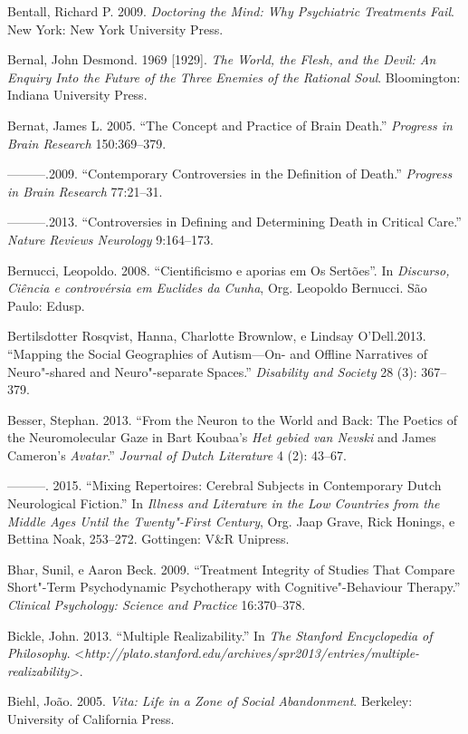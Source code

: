 Bentall, Richard P. 2009. \emph{Doctoring the Mind: Why Psychiatric
Treatments Fail}. New York: New York University Press.

Bernal, John Desmond. 1969 {[}1929{]}. \emph{The World, the Flesh, and
the Devil: An Enquiry Into the Future of the Three Enemies of the
Rational Soul}. Bloomington: Indiana University Press.

Bernat, James L. 2005. ``The Concept and Practice of Brain Death.''
\emph{Progress in Brain Research} 150:369--379.

---------.2009. ``Contemporary Controversies in the Definition of
Death.'' \emph{Progress in Brain Research} 77:21--31.

---------.2013. ``Controversies in Defining and Determining Death in
Critical Care.'' \emph{Nature Reviews Neurology} 9:164--173.

Bernucci, Leopoldo. 2008. ``Cientificismo e aporias em Os Sertões''. In
\emph{Discurso, Ciência e controvérsia em Euclides da Cunha}, Org.
Leopoldo Bernucci. São Paulo: Edusp.

Bertilsdotter Rosqvist, Hanna, Charlotte Brownlow, e Lindsay
O'Dell.2013. ``Mapping the Social Geographies of Autism---On- and
Offline Narratives of Neuro"-shared and Neuro"-separate Spaces.''
\emph{Disability and Society} 28 (3): 367--379.

Besser, Stephan. 2013. ``From the Neuron to the World and Back: The
Poetics of the Neuromolecular Gaze in Bart Koubaa's \emph{Het gebied van
Nevski} and James Cameron's \emph{Avatar}.'' \emph{Journal of Dutch
Literature} 4 (2): 43--67.

---------. 2015. ``Mixing Repertoires: Cerebral Subjects in Contemporary
Dutch Neurological Fiction.'' In \emph{Illness and Literature in the Low
Countries from the Middle Ages Until the Twenty"-First Century}, Org.
Jaap Grave, Rick Honings, e Bettina Noak, 253--272. Gottingen: V\&R
Unipress.

Bhar, Sunil, e Aaron Beck. 2009. ``Treatment Integrity of Studies That
Compare Short"-Term Psychodynamic Psychotherapy with Cognitive"-Behaviour
Therapy.'' \emph{Clinical Psychology: Science and Practice} 16:370--378.

Bickle, John. 2013. ``Multiple Realizability.'' In \emph{The Stanford
Encyclopedia of Philosophy}.
\textless{}\emph{http://plato.stanford.edu/archives/spr2013/entries/multiple-realizability}\textgreater{}.

Biehl, João. 2005. \emph{Vita: Life in a Zone of Social Abandonment}.
Berkeley: University of California Press.

